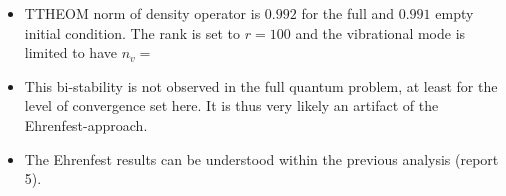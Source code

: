 \documentclass{article}
\begin{document}
\begin{itemize}
	\item TTHEOM norm of density operator is $0.992$ for the full and $0.991$ empty initial condition. The rank is set to $r=100$ and the vibrational mode is limited to have $n_v = $ 
	\item This bi-stability is not observed in the full quantum problem, at least for the level of convergence set here. It is thus very likely an artifact of the Ehrenfest-approach.
	\item The Ehrenfest results can be understood within the previous analysis (report 5).
\end{itemize}
\end{document}

